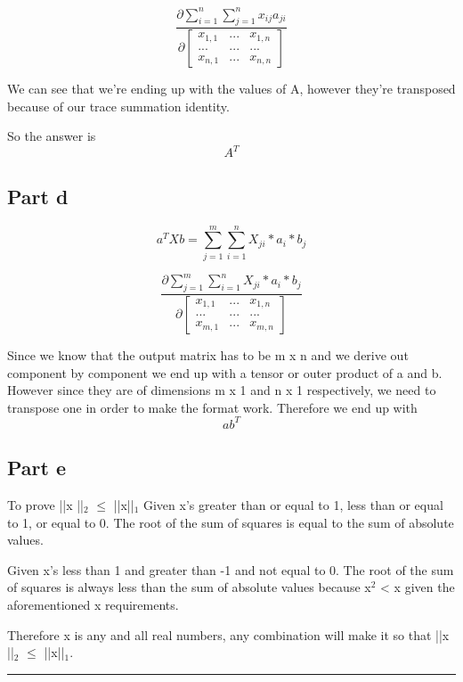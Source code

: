 \documentclass[11pt]{article}
\begin{document}
$$ \dfrac{\partial \sum_{i=1}^{n} \sum_{j=1}^{n} x_{ij} a_{ji}}{ \partial \begin{bmatrix}
x_{1,1} &...  & x_{1,n} \\
... & ...  & ...\\
x_{n,1} & ... & x_{n,n}
\end{bmatrix} } $$

We can see that we're ending up with the values of A, however they're transposed because of our trace summation identity.

So the answer is $$A^T$$

\subsection{Part d}
\label{sec-6-4}

$$ a^T X b = \sum_{j=1}^{m} \sum_{i=1}^{n} X_{ji} * a_{i} * b_{j} $$

$$ \dfrac{ \partial \sum_{j=1}^{m} \sum_{i=1}^{n} X_{ji} * a_{i} * b_{j}}{ \partial \begin{bmatrix}
x_{1,1} &...  & x_{1,n} \\
... & ...  & ...\\
x_{m,1} & ... & x_{m,n}
\end{bmatrix} } $$

Since we know that the output matrix has to be m x n and we derive out component by component we end up with a tensor or outer product of a and b. However since they are of dimensions m x 1 and n x 1 respectively, we need to transpose one in order to make the format work. Therefore we end up with $$ ab^T $$

\subsection{Part e}
\label{sec-6-5}
To prove ||x ||$_{\text{2}}$ $\le$ ||x||$_{\text{1}}$
Given x's greater than or equal to 1, less than or equal to 1, or equal to 0. The root of the sum of squares is equal to the sum of absolute values.

Given x's less than 1 and greater than -1 and not equal to 0. The root of the sum of squares is always less than the sum of absolute values because x$^{\text{2}}$ < x given the aforementioned x requirements.

Therefore x is any and all real numbers, any combination will make it so that ||x ||$_{\text{2}}$ $\le$ ||x||$_{\text{1}}$.

\rule{\linewidth}{0.5pt}
\end{document}
